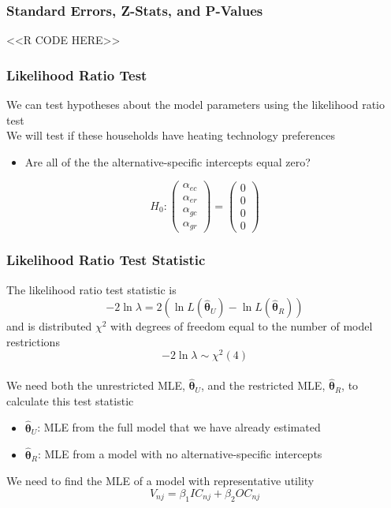 \documentclass{beamer}
\begin{document}
\begin{frame}[fragile]\frametitle{Standard Errors, Z-Stats, and P-Values}
    <<R CODE HERE>>
\end{frame}

\begin{frame}\frametitle{Likelihood Ratio Test}
    We can test hypotheses about the model parameters using the likelihood ratio test \\
    \vspace{3ex}
    We will test if these households have heating technology preferences
    \begin{itemize}
    	\item Are all of the the alternative-specific intercepts equal zero?
    \end{itemize}
    \vspace{1ex}
    $$H_0: \begin{pmatrix}
    	\alpha_{ec} \\ 
    	\alpha_{er} \\
    	\alpha_{gc} \\
    	\alpha_{gr}
    \end{pmatrix} = \begin{pmatrix}
    	0 \\
    	0 \\
    	0 \\
    	0
    \end{pmatrix}$$
\end{frame}

\begin{frame}\frametitle{Likelihood Ratio Test Statistic}
    The likelihood ratio test statistic is
    $$-2 \ln \lambda = 2 \left( \ln L(\widehat{\bm{\theta}}_U) - \ln L(\widehat{\bm{\theta}}_R) \right)$$
    and is distributed $\chi^2$ with degrees of freedom equal to the number of model restrictions
    $$-2 \ln \lambda \sim \chi^2(4)$$ \\
    \vspace{2ex}
    We need both the unrestricted MLE, $\widehat{\bm{\theta}}_U$, and the restricted MLE, $\widehat{\bm{\theta}}_R$, to calculate this test statistic
    \begin{itemize}
    	\item $\widehat{\bm{\theta}}_U$: MLE from the full model that we have already estimated
    	\item $\widehat{\bm{\theta}}_R$: MLE from a model with no alternative-specific intercepts
    \end{itemize}
    \vspace{2ex}
    We need to find the MLE of a model with representative utility
    $$V_{nj} = \beta_1 IC_{nj} + \beta_2 OC_{nj}$$
\end{frame}
\end{document}
